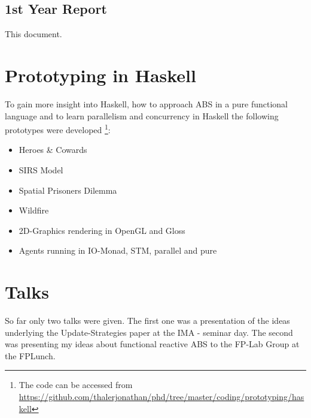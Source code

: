 \subsection{1st Year Report}
This document.

\section{Prototyping in Haskell}
To gain more insight into Haskell, how to approach ABS in a pure functional language and to learn parallelism and concurrency in Haskell the following prototypes were developed \footnote{The code can be accessed from \url{https://github.com/thalerjonathan/phd/tree/master/coding/prototyping/haskell}}:

\begin{itemize}
	\item Heroes \& Cowards 
	\item SIRS Model
	\item Spatial Prisoners Dilemma
	\item Wildfire
	\item 2D-Graphics rendering in OpenGL and Gloss 
	\item Agents running in IO-Monad, STM, parallel and pure
\end{itemize}

\section{Talks}
So far only two talks were given. The first one was a presentation of the ideas underlying the Update-Strategies paper at the IMA - seminar day. The second was presenting my ideas about functional reactive ABS to the FP-Lab Group at the FPLunch.